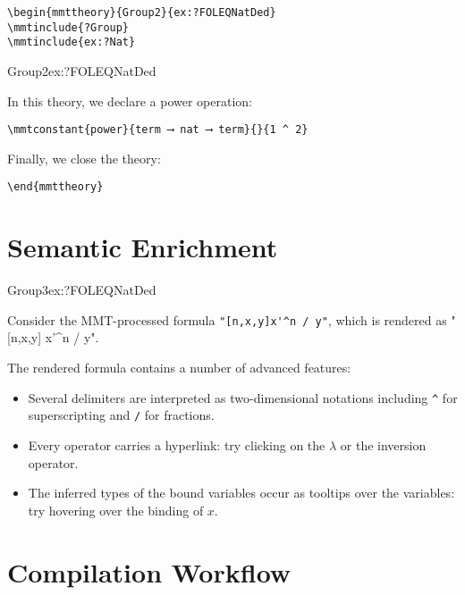 \documentclass{article}
\begin{document}
\begin{lstlisting}
\begin{mmttheory}{Group2}{ex:?FOLEQNatDed}
\mmtinclude{?Group}
\mmtinclude{ex:?Nat}
\end{lstlisting}
\begin{mmttheory}{Group2}{ex:?FOLEQNatDed}

In this theory, we declare a power operation:

\begin{lstlisting}
\mmtconstant{power}{term ⟶ nat ⟶ term}{}{1 ^ 2}
\end{lstlisting}

Finally, we close the theory:

\begin{lstlisting}
\end{mmttheory}
\end{lstlisting}
\end{mmttheory}


\section{Semantic Enrichment}

\begin{mmttheory}{Group3}{ex:?FOLEQNatDed}

Consider the MMT-processed formula \lstinline|"[n,x,y]x'^n / y"|, which is rendered as "[n,x,y] x'^n / y".
\end{mmttheory}

The rendered formula contains a number of advanced features:
\begin{itemize}
\item Several delimiters are interpreted as two-dimensional notations including \lstinline|^| for superscripting and \lstinline|/| for fractions.
\item Every operator carries a hyperlink: try clicking on the $\lambda$ or the inversion operator.
\item The inferred types of the bound variables occur as tooltips over the variables: try hovering over the binding of $x$.
\end{itemize}

\section{Compilation Workflow}\label{sec:workflow}
\end{document}
